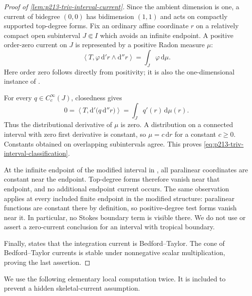 \begin{proof}[Proof of \cref{lem:p213-triv-interval-current}]
Since the ambient dimension is one, a current of bidegree $(0,0)$ has
bidimension $(1,1)$ and acts on compactly supported top-degree forms.
Fix an ordinary affine coordinate \(r\) on a relatively compact open
subinterval \(J\Subset I\) which avoids an infinite endpoint.  A positive
order-zero current on \(J\) is represented by a positive Radon measure
\(\mu\):
\begin{equation}
 \left\langle T,\varphi\,\mathrm d'r\wedge\mathrm d''r\right\rangle
       =\int_J\varphi\,\mathrm d\mu .
\label{eq:p213-triv-interval-measure}
\end{equation}
Here order zero follows directly from positivity; it is also the
one-dimensional instance of \cite[Proposition~7.2.9]{CLD25}.

For every \(q\in C_c^\infty(J)\), closedness gives
\begin{equation}
 0=\left\langle T,
       \mathrm d'\bigl(q\,\mathrm d''r\bigr)\right\rangle
   =\int_Jq'(r)\,\mathrm d\mu(r).
\label{eq:p213-triv-zero-distributional-derivative}
\end{equation}
Thus the distributional derivative of \(\mu\) is zero.  A distribution on a
connected interval with zero first derivative is constant, so
\(\mu=c\,\mathrm dr\) for a constant \(c\geq0\).  Constants obtained on
overlapping subintervals agree.  This proves
\eqref{eq:p213-triv-interval-classification}.

At the infinite endpoint of the modified interval in
\cite[\S6.7.2]{CLD25}, all paralinear coordinates are constant near the
endpoint.  Top-degree forms therefore vanish near that endpoint, and no
additional endpoint current occurs.  The same observation applies at every
included finite endpoint in the modified structure: paralinear functions
are constant there by definition, so positive-degree test forms vanish
near it.  In particular, no Stokes boundary term is visible there.  We do
not use or assert a zero-current conclusion for an interval with tropical
boundary.

Finally, \cite[Example~8.6.4]{CLD25} states that the integration current is
Bedford--Taylor.  The cone of Bedford--Taylor currents is stable under
nonnegative scalar multiplication, proving the last assertion.
\end{proof}

\medskip

We use the following elementary local computation twice.  It is included
to prevent a hidden skeletal-current assumption.

